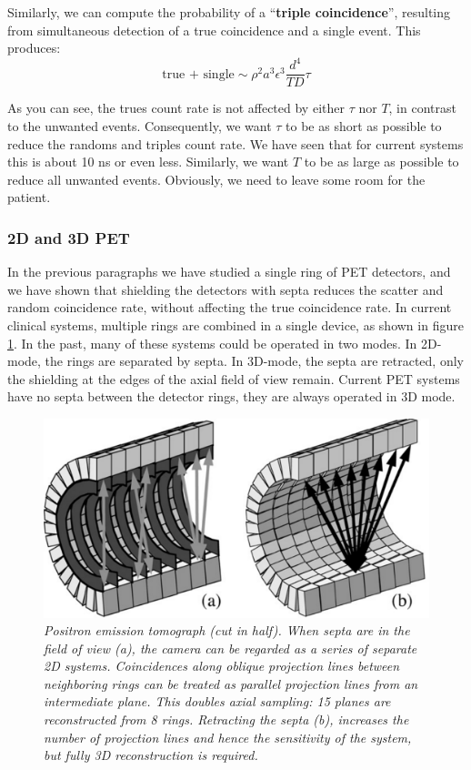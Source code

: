Similarly, we can compute the probability of a ``{\bf triple coincidence}'',
resulting from simultaneous detection of a true coincidence and a single
event. This produces:
\begin{equation}
  \mbox{true + single} \sim \rho^2 a^3 \epsilon^3 \frac{d^4}{TD} \tau
\end{equation}

As you can see, the trues count rate is not affected by either $\tau$
nor $T$, in contrast to the unwanted events. Consequently, we want
$\tau$ to be as short as possible to reduce the randoms and triples
count rate. We have seen that for current systems this is about 10 ns
or even less. Similarly, we want $T$ to be as large as possible to
reduce all unwanted events. Obviously, we need to leave some room for
the patient.


\subsubsection{2D and 3D PET \label{sec:2D3DPET}}
In the previous paragraphs we have studied a single ring of PET
detectors, and we have shown that shielding the detectors with septa
reduces the scatter and random coincidence rate, without affecting the
true coincidence rate. In current clinical systems, multiple rings are
combined in a single device, as shown in figure \ref{fig:jnpet}. In
the past, many of these systems could be operated in two modes.  In
2D-mode, the rings are separated by septa. In 3D-mode, the septa are
retracted, only the shielding at the edges of the axial field of view
remain. Current PET systems have no septa between the detector rings,
they are always operated in 3D mode.

\begin{figure}[tb]
\centering
\includegraphics[width=\figone]{figs/fig_jnpet.pdf}
\caption{\label{fig:jnpet} \emph{Positron emission tomograph (cut in
half). When septa are in the field of view (a), the camera can be regarded as
a series of separate 2D systems. Coincidences along oblique projection lines
between neighboring rings can be treated as parallel projection lines from an
intermediate plane. This doubles axial sampling: 15 planes are reconstructed
from 8 rings. Retracting the septa (b), increases the number of projection
lines and hence the sensitivity of the system, but fully 3D reconstruction is
required.}}
\end{figure}

